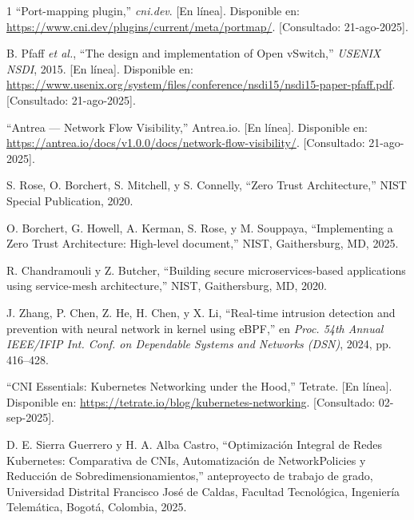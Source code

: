 \documentclass[journal]{IEEEtran}
\begin{document}
\begin{thebibliography}{1}
``Port-mapping plugin,'' \emph{cni.dev}. [En línea]. Disponible en: \url{https://www.cni.dev/plugins/current/meta/portmap/}. [Consultado: 21-ago-2025].

B. Pfaff \emph{et al.}, ``The design and implementation of Open vSwitch,'' \emph{USENIX NSDI}, 2015. [En línea]. Disponible en: \url{https://www.usenix.org/system/files/conference/nsdi15/nsdi15-paper-pfaff.pdf}. [Consultado: 21-ago-2025].

``Antrea — Network Flow Visibility,'' Antrea.io. [En línea]. Disponible en: \url{https://antrea.io/docs/v1.0.0/docs/network-flow-visibility/}. [Consultado: 21-ago-2025].

S. Rose, O. Borchert, S. Mitchell, y S. Connelly, ``Zero Trust Architecture,'' NIST Special Publication, 2020.

O. Borchert, G. Howell, A. Kerman, S. Rose, y M. Souppaya, ``Implementing a Zero Trust Architecture: High-level document,'' NIST, Gaithersburg, MD, 2025.

R. Chandramouli y Z. Butcher, ``Building secure microservices-based applications using service-mesh architecture,'' NIST, Gaithersburg, MD, 2020.

J. Zhang, P. Chen, Z. He, H. Chen, y X. Li, ``Real-time intrusion detection and prevention with neural network in kernel using eBPF,'' en \emph{Proc. 54th Annual IEEE/IFIP Int. Conf. on Dependable Systems and Networks (DSN)}, 2024, pp. 416--428.

``CNI Essentials: Kubernetes Networking under the Hood,'' Tetrate. [En línea]. Disponible en: \url{https://tetrate.io/blog/kubernetes-networking}. [Consultado: 02-sep-2025].

D. E. Sierra Guerrero y H. A. Alba Castro, ``Optimización Integral de Redes Kubernetes: Comparativa de CNIs, Automatización de NetworkPolicies y Reducción de Sobredimensionamientos,'' anteproyecto de trabajo de grado, Universidad Distrital Francisco José de Caldas, Facultad Tecnológica, Ingeniería Telemática, Bogotá, Colombia, 2025.
\end{thebibliography}
\end{document}
